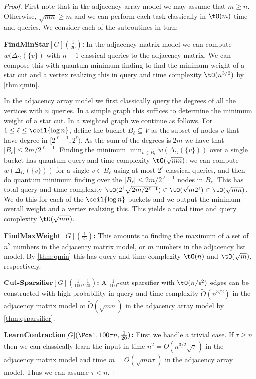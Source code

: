 \begin{proof}
First note that in the adjacency array model we may assume that $m \ge n$. Otherwise, $\sqrt{mn} \ge m$ and we can perform each task classically in $\tO(m)$ time and queries.
We consider each of the subroutines in turn:

\textbf{FindMinStar$[G](\frac{1}{20})$:} In the adjacency matrix model we can compute $w(\Delta_G(\{v\})$ with $n-1$ classical queries to the adjacency matrix.  
We can compose this with quantum minimum finding to find the minimum weight of a star cut and a vertex realizing this in query and time complexity $\tO(n^{3/2})$ by \cref{thm:qmin}.

In the adjacency array model we first classically query the degrees of all the vertices with $n$ queries.  In a simple graph this suffices to determine the minimum weight of a star cut.
In a weighted graph we continue as follows.  For $1 \leq \ell \leq \ceil{\log n}$, define the bucket $B_\ell \subseteq V$ as the subset of nodes $v$ that have degree in $[2^{\ell-1}, 2^\ell)$.
As the sum of the degrees is $2m$ we have that $|B_\ell| \leq 2m/2^{\ell-1}$.
Finding the minimum $\min_{v \in B_\ell} w(\Delta_G(\{v\}))$ over a single bucket has quantum query and time complexity $\tO(\sqrt{mn})$: we can compute $w(\Delta_G(\{v\}))$ for a single $v \in B_\ell$ using at most $2^\ell$ classical queries, and 
then do quantum minimum finding over the $|B_\ell| \leq 2m/2^{\ell-1}$ nodes in $B_\ell$.
This has total query and time complexity $\tO(2^\ell \sqrt{2m/2^{\ell-1}}) \in \tO(\sqrt{m 2^\ell}) \in \tO(\sqrt{mn})$.
We do this for each of the $\ceil{\log n}$ buckets and we output the minimum overall weight and a vertex realizing this.
This yields a total time and query complexity $\tO(\sqrt{mn})$.

\textbf{FindMaxWeight$[G](\frac{1}{20})$:}
This amounts to finding the maximum of a set of $n^2$ numbers in the adjacency matrix model, or $m$ numbers in the adjacency list model.
By \cref{thm:qmin} this has query and time complexity $\tO(n)$ and $\tO(\sqrt{m})$, respectively.

\textbf{Cut-Sparsifier$[G](\frac{1}{100}, \frac{1}{20})$:} A $\frac{1}{100}$-cut sparsifier with $\tO(n/\epsilon^2)$ edges can be constructed with high probability in query and time complexity $\tilde O(n^{3/2})$ in the adjacency matrix model or $\tilde O(\sqrt{mn})$ in the adjacency array model by \cref{thm:qsparsifier}.  

\textbf{LearnContraction$[G](\Pcal, 100\tau n, \frac{1}{20})$:} 
First we handle a trivial case.  If $\tau \ge n$ then we can classically learn the input in time $n^2 = O(n^{3/2}\sqrt{\tau})$ in the adjacency matrix model and 
time $m = O(\sqrt{mn\tau})$ in the adjacency array model.  Thus we can assume $\tau < n$.  


\end{proof}
